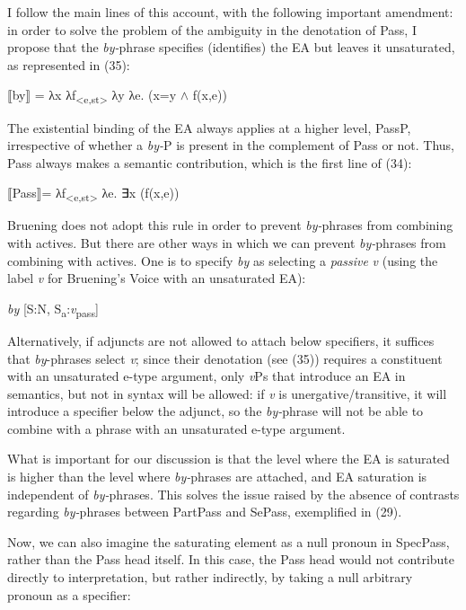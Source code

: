 \documentclass[output=paper]{langsci/langscibook}
\begin{document}
I follow the main lines of this account, with the following important amendment: in order to solve the problem of the ambiguity in the denotation of Pass, I propose that the \textit{by-}phrase specifies (identifies) the EA but leaves it unsaturated, as represented in (35):

\ea%
    \label{ex:giurgea:35}
    ⟦by⟧ = λx λf\textsubscript{<e,st>} λy λe. (x=y $\wedge$ f(x,e))
\z

The existential binding of the EA always applies at a higher level, PassP, irrespective of whether a \textit{by-}P is present in the complement of Pass or not. Thus, Pass always makes a semantic contribution, which is the first line of (34):

\ea%
    \label{ex:giurgea:36}
⟦Pass⟧= λf\textsubscript{<e,st>} λe. ∃x (f(x,e))
\z


Bruening does not adopt this rule in order to prevent \textit{by-}phrases from combining with actives. But there are other ways in which we can prevent \textit{by-}phrases from combining with actives. One is to specify \textit{by} as selecting a \textit{passive} \textit{v} (using the label \textit{v} for Bruening’s Voice with an unsaturated EA):

\ea%
    \label{ex:giurgea:37}
    \textit{by} [S:N, S\textsubscript{a}:\textit{v}\textsubscript{pass}]
\z

Alternatively, if adjuncts are not allowed to attach below specifiers, it suffices that \textit{by}{}-phrases select \textit{v}; since their denotation (see (35)) requires a constituent with an unsaturated e-type argument, only \textit{v}Ps that introduce an EA in semantics, but not in syntax will be allowed: if \textit{v} is unergative\slash transitive, it will introduce a specifier below the adjunct, so the \textit{by-}phrase will not be able to combine with a phrase with an unsaturated e-type argument.

What is important for our discussion is that the level where the EA is saturated is higher than the level where \textit{by-}phrases are attached, and EA saturation is independent of \textit{by-}phrases. This solves the issue raised by the absence of contrasts regarding \textit{by-}phrases between PartPass and SePass, exemplified in (29). 

Now, we can also imagine the saturating element as a null pronoun in SpecPass, rather than the Pass head itself. In this case, the Pass head would not contribute directly to interpretation, but rather indirectly, by taking a null arbitrary pronoun as a specifier:
\end{document}
